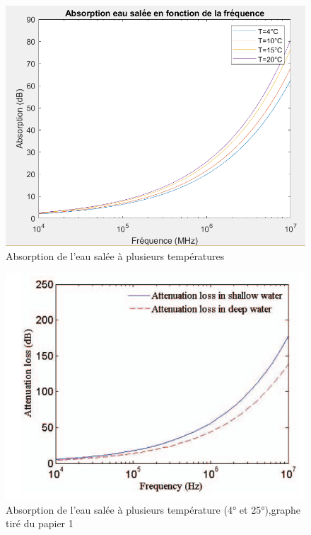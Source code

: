\documentclass{article}
\begin{document}
\begin{figure}[H]
    \caption{Absorption de l'eau salée à plusieurs températures}
    \includegraphics[scale=0.6]{images/temp.PNG}
    \centering
\end{figure}

\begin{figure}[H]
    \caption{Absorption de l'eau salée à plusieurs température (4° et 25°),graphe tiré du papier 1}
    \includegraphics[scale=0.6]{images/papier2.PNG}
    \centering
\end{figure}
\end{document}

